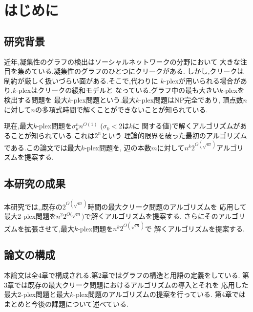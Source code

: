 \documentclass{thesis}
\theoremstyle{definition}
\begin{document}
\baselineskip=22pt
\pagestyle{empty}

\maketitle

\pagestyle{myheadings}	%
\tableofcontents

\newpage


\chapter{はじめに}

\section{研究背景}
近年,凝集性のグラフの検出はソーシャルネットワークの分野において
大きな注目を集めている.凝集性のグラフのひとつにクリークがある.
しかし,クリークは制約が厳しく扱いづらい面がある.そこで,代わりに
$k$-plexが用いられる場合があり,$k$-plexはクリークの緩和モデルと
なっている.グラフ中の最も大きい$k$-plexを検出する問題を
最大$k$-plex問題という.最大$k$-plex問題はNP完全であり,
頂点数$n$に対して$n$の多項式時間で解くことができないことが知られている.

現在,最大$k$-plex問題を$\sigma_{k}^{n}n^{O(1) }$ ($\sigma_{k} < 2$は$k$に
関する値)で解くアルゴリズムがあることが知られている.これは$2^{n}$という
理論的限界を破った最初のアルゴリズムである.この論文では最大$k$-plex問題を,
辺の本数$m$に対して$n^{k }2^{O(\sqrt{m})}$アルゴリズムを提案する.

\section{本研究の成果}
本研究では,,既存の$2^{O(\sqrt{m})}$時間の最大クリーク問題のアルゴリズムを
応用して最大2-plex問題を$n^{2}2^{O(\sqrt{m}})$で解くアルゴリズムを提案する.
さらにそのアルゴリズムを拡張させて,最大$k$-plex問題を$n^{k }2^{O(\sqrt{m})}$で
解くアルゴリズムを提案する.

\section{論文の構成}
本論文は全4章で構成される.第2章ではグラフの構造と用語の定義をしている.
第3章では既存の最大クリーク問題におけるアルゴリズムの導入とそれを
応用した最大2-plex問題と最大$k$-plex問題のアルゴリズムの提案を行っている.
第4章ではまとめと今後の課題について述べている.
\end{document}
